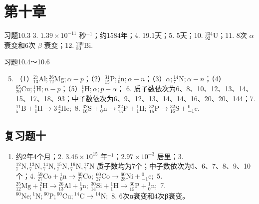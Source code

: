 \section{第十章}

习题10.3 3. \(1.39 \times 10^{-11}\) 秒\(^{-1}\)；约1584年；4.
19.1天；5. 5天；10. \(^{234}_{92}\mathrm{U}\)；11. 8次 \(\alpha\)
衰变和6次 \(\beta\) 衰变；12. \(^{209}_{83}\mathrm{Bi}\).

习题10.4～10.6

\begin{enumerate}
\setcounter{enumi}{4}
\item
  （1）\({}^{27}_{13}\mathrm{Al};{}^{26}_{12}\mathrm{Mg};\alpha-p\)；（2）\({}^{31}_{15}\mathrm{P};{}^{1}_{0}\mathrm n;\alpha-n\)；（3）\(\alpha;{}^{14}_{7}\mathrm N;\alpha-n\)；（4）\({}^{65}_{29}\mathrm{Cu};{}^{1}_{1}\mathrm H;n-p\)；（5）\({}^{1}_{1}\mathrm H;\alpha;p-\alpha\)；
  6.
  质子数依次为6、8、10、12、13、14、15、17、18、93；中子数依次为6、9、12、13、14、14、16、20、20、144；7.
  \({}^{11}_{5}\mathrm{B}+{}^{1}_{1}\mathrm{H}\longrightarrow3\,{}^{4}_{2}\mathrm{He};\)
  8.
  \({}^{32}_{16}\mathrm{S}+{}^{1}_{0}\mathrm{n}\longrightarrow{}^{32}_{15}\mathrm{P}+{}^{1}_{1}\mathrm{H};\ {}^{32}_{15}\mathrm{P}\longrightarrow{}^{32}_{16}\mathrm{S}+{}^{0}_{-1}\mathrm{e}.\)
\end{enumerate}

\subsection{复习题十}

\begin{enumerate}
\item
  约2年4个月；2. \(3.46\times10^{15}\)
  年\(^{-1}\)；\(2.97\times10^{-3}\) 居里；3.
  \({}^{12}_{7}\mathrm{N},{}^{13}_{7}\mathrm{N},{}^{14}_{7}\mathrm{N},{}^{15}_{7}\mathrm{N},{}^{16}_{7}\mathrm{N},{}^{17}_{7}\mathrm{N}\)
  质子数均为7个；中子数依次为5、6、7、8、9、10个；4.
  \({}^{59}_{27}\mathrm{Co}+{}^{1}_{0}\mathrm{n}\rightarrow{}^{60}_{27}\mathrm{Co};\ {}^{60}_{27}\mathrm{Co}\rightarrow{}^{60}_{28}\mathrm{Ni}+{}^{0}_{-1}\mathrm{e};\)
  5.
  \({}^{25}_{12}\mathrm{Mg}+{}^{2}_{1}\mathrm{H}\rightarrow{}^{26}_{13}\mathrm{Al}+{}^{1}_{0}\mathrm{n};\ {}^{30}_{14}\mathrm{Si}+{}^{1}_{1}\mathrm{H}\rightarrow{}^{30}_{15}\mathrm{P}+{}^{1}_{0}\mathrm{n};\)
  7.
  \({}^{60}\mathrm{Ne}; {}^{1}\mathrm{N}; {}^{60}\mathrm{P}; {}^{60}\mathrm{Cu}; {}^{14}\mathrm{C} \rightarrow {}^{14}\mathrm{N};\)
  8. 6次α衰变和4次β衰变。
\end{enumerate}

